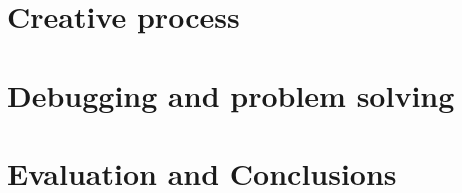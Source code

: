 \documentclass[12pt]{report}
\begin{document}
\chapter{Creative process}
\label{sec:orga3e67eb}
\chapter{Debugging and problem solving}
\label{sec:org3280de0}
\chapter{Evaluation and Conclusions}
\label{sec:org707b8bd}
 

\end{document}
